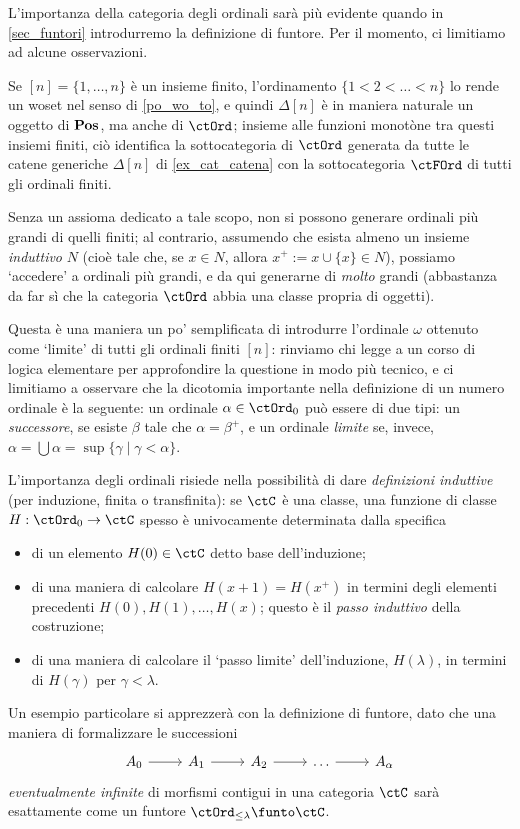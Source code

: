 L'importanza della categoria degli ordinali sarà più evidente quando in \ref{sec_funtori} introdurremo la definizione di funtore. Per il momento, ci limitiamo ad alcune osservazioni.
\begin{remark}
	Se \([n]=\{1,\dots,n\}\) è un insieme finito, l'ordinamento \(\{1<2<\dots<n\}\) lo rende un woset nel senso di \ref{po_wo_to}, e quindi \(\Delta[n]\) è in maniera naturale un oggetto di \(\mathbf{Pos}\), ma anche di \(\ctOrd\); insieme alle funzioni monotòne tra questi insiemi finiti, ciò identifica la sottocategoria di \(\ctOrd\) generata da tutte le catene generiche \(\Delta[n]\) di \ref{ex_cat_catena} con la sottocategoria \(\ctFOrd\) di tutti gli ordinali finiti.
\end{remark}
\begin{remark}
	Senza un assioma dedicato a tale scopo, non si possono generare ordinali più grandi di quelli finiti; al contrario, assumendo che esista almeno un insieme \emph{induttivo} \(N\) (cioè tale che, se \(x\in N\), allora \(x^+:=x\cup\{x\}\in N\)), possiamo `accedere' a ordinali più grandi, e da qui generarne di \emph{molto} grandi (abbastanza da far sì che la categoria \(\ctOrd\) abbia una classe propria di oggetti).

	Questa è una maniera un po' semplificata di introdurre l'ordinale \(\omega\) ottenuto come `limite' di tutti gli ordinali finiti \([n]\): rinviamo chi legge a un corso di logica elementare per approfondire la questione in modo più tecnico, e ci limitiamo a osservare che la dicotomia importante nella definizione di un numero ordinale è la seguente: un ordinale \(\alpha\in\ctOrd_0\) può essere di due tipi: un \emph{successore}, se esiste \(\beta\) tale che \(\alpha=\beta^+\), e un ordinale \emph{limite} se, invece, \(\alpha=\bigcup\alpha=\sup\{\gamma\mid \gamma < \alpha\}\).
\end{remark}
\begin{remark}
	L'importanza degli ordinali risiede nella possibilità di dare \emph{definizioni induttive} (per induzione, finita o transfinita): se \(\ctC\) è una classe, una funzione di classe \(H : \ctOrd_0\to\ctC\) spesso è univocamente determinata dalla specifica
	\begin{itemize}
		\item di un elemento \(H(0)\in\ctC\) detto base dell'induzione;
		\item di una maniera di calcolare \(H(x+1)=H(x^+)\) in termini degli elementi precedenti \(H(0), H(1),\dots,H(x)\); questo è il \emph{passo induttivo} della costruzione;
		\item di una maniera di calcolare il `passo limite' dell'induzione, \(H(\lambda)\), in termini di \(H(\gamma)\) per \(\gamma < \lambda\).
	\end{itemize}
	Un esempio particolare si apprezzerà con la definizione di funtore, dato che una maniera di formalizzare le successioni
	\[\begin{tikzcd}
			A_0 \ar[r] & A_1 \ar[r] & A_2 \ar[r] & \dots \ar[r] & A_\alpha
		\end{tikzcd}\]
	\emph{eventualmente infinite} di morfismi contigui in una categoria \(\ctC\) sarà esattamente come un funtore \(\ctOrd_{\le\lambda}\funto \ctC\).
\end{remark}
